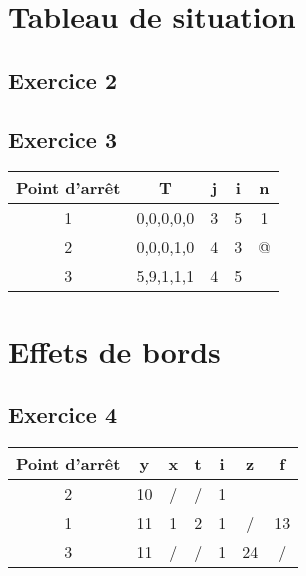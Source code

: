 \section{Tableau de situation}	
\subsection{Exercice 2}
\subsection{Exercice 3}


\begin{center}
\begin{tabular}{c  |  c  c  c  c  }
\textbf{Point d'arrêt }& \textbf{T} & \textbf{j} & \textbf{i} &\textbf{n}\\
\hline
1 & 0,0,0,0,0 & 3 & 5 & 1\\
\hline
2 & 0,0,0,1,0 & 4 & 3 & @\\
\hline
3 & 5,9,1,1,1&4&5&\\
\hline
\end{tabular}
\end{center}
\newpage
\section{Effets de bords}
\subsection{Exercice 4}

\begin{center}
\begin{tabular}{c |  c  c  c  c  c  c  }
	\textbf{Point d'arrêt} & \textbf{y} & \textbf{x} & \textbf{t} & \textbf{i} & \textbf{z} & \textbf{f}\\
	\hline
	2 & 10 & / & / & 1 && \\
	\hline
	1 & 11 & 1 & 2 & 1 & / & 13\\
	\hline
	3 & 11 & / & / & 1 & 24 & /\\
	\hline
\end{tabular}
\end{center}
\newpage
